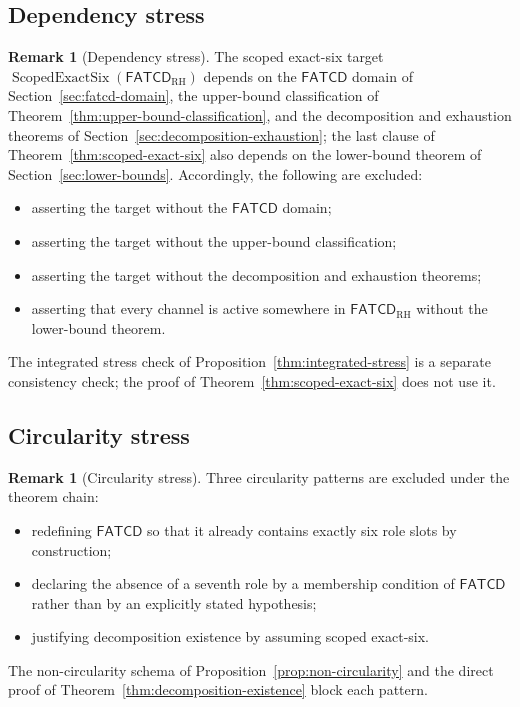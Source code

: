 \documentclass[11pt]{article}
\theoremstyle{definition}
\newtheorem{remark}[theorem]{Remark}
\newcommand{\FATCD}{\ensuremath{\mathsf{FATCD}}}
\newcommand{\ScopedExactSix}[1]{\ensuremath{\operatorname{ScopedExactSix}\!\left(#1\right)}}
\begin{document}
\subsection{Dependency stress}\label{subsec:dependency-stress}

\begin{remark}[Dependency stress]\label{prop:dependency-stress}
The scoped exact-six target \(\ScopedExactSix{\FATCD_{\mathrm{RH}}}\)
depends on the \FATCD{} domain of Section~\ref{sec:fatcd-domain}, the
upper-bound classification of Theorem~\ref{thm:upper-bound-classification},
and the decomposition and exhaustion theorems of
Section~\ref{sec:decomposition-exhaustion}; the last clause of
Theorem~\ref{thm:scoped-exact-six} also depends on the lower-bound theorem of
Section~\ref{sec:lower-bounds}. Accordingly, the following are excluded:
\begin{itemize}[topsep=2pt,itemsep=1pt]
  \item asserting the target without the \FATCD{} domain;
  \item asserting the target without the upper-bound classification;
  \item asserting the target without the decomposition and exhaustion
    theorems;
  \item asserting that every channel is active somewhere in
    \(\FATCD_{\mathrm{RH}}\) without the lower-bound theorem.
\end{itemize}
The integrated stress check of Proposition~\ref{thm:integrated-stress} is a
separate consistency check; the proof of Theorem~\ref{thm:scoped-exact-six}
does not use it.
\end{remark}

\subsection{Circularity stress}\label{subsec:circularity-stress}

\begin{remark}[Circularity stress]\label{prop:circularity-stress}
Three circularity patterns are excluded under the theorem chain:
\begin{itemize}[topsep=2pt,itemsep=1pt]
  \item redefining \FATCD{} so that it already contains exactly six role
    slots by construction;
  \item declaring the absence of a seventh role by a membership condition
    of \FATCD{} rather than by an explicitly stated hypothesis;
  \item justifying decomposition existence by assuming scoped
    exact-six.
\end{itemize}
The non-circularity schema of Proposition~\ref{prop:non-circularity} and
the direct proof of Theorem~\ref{thm:decomposition-existence}
block each pattern.
\end{remark}
\end{document}

